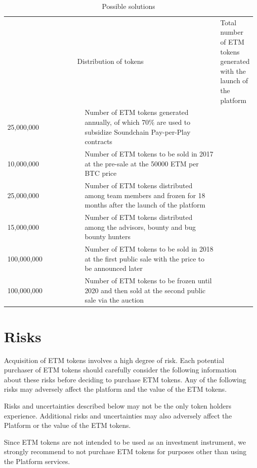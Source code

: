 \documentclass[12pt]{report}
\begin{document}
\begin{table}[H]
\centering
\caption{Possible solutions}
\vspace{20pt}
\begin{tabular}{p{0.35\linewidth}p{0.65\linewidth}}
\toprule
\multicolumn{2}{c}{Distribution of tokens}
\bottomrule
\midrule
250,000,000 & 
Total number of ETM tokens generated with
 the launch of the platform \\
25,000,000 & 
Number of ETM tokens generated annually, of which 70\% are used to subsidize Soundchain Pay-per-Play contracts \\
10,000,000 &
Number of ETM tokens to be sold in 2017 at the pre-sale at the 50000 ETM per BTC price \\
25,000,000 & 
Number of ETM tokens distributed among team members and frozen for 18 months after the launch of the platform \\
15,000,000 &
Number of ETM tokens distributed among the advisors, bounty and bug bounty hunters \\
100,000,000 &
Number of ETM tokens to be sold in 2018 at the first public sale with the price to be announced later \\
100,000,000 &
Number of ETM tokens to be frozen until 2020 and then sold at the second public sale via the auction \\
\bottomrule
\end{tabular}
\end{table}


\chapter{Risks}
\label{risks}

Acquisition of ETM tokens involves a high degree of risk. Each potential purchaser of ETM tokens should carefully consider the following information about these risks before deciding to purchase ETM tokens. Any of the following risks may adversely affect the platform and the value of the ETM tokens.

Risks and uncertainties described below may not be the only token holders experience. Additional risks and uncertainties may also adversely affect the Platform or the value of the ETM tokens.

Since ETM tokens are not intended to be used as an investment instrument, we strongly recommend to not purchase ETM tokens for purposes other than using the Platform services. 
\end{document}
